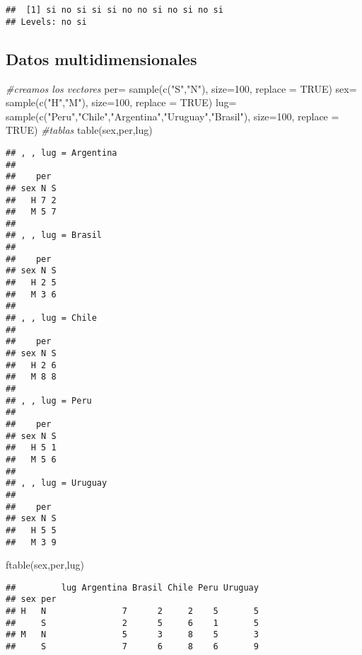 \documentclass[
]{article}
\newenvironment{Shaded}{\begin{snugshade}}{\end{snugshade}}
\newcommand{\AttributeTok}[1]{\textcolor[rgb]{0.77,0.63,0.00}{#1}}
\newcommand{\CommentTok}[1]{\textcolor[rgb]{0.56,0.35,0.01}{\textit{#1}}}
\newcommand{\ConstantTok}[1]{\textcolor[rgb]{0.00,0.00,0.00}{#1}}
\newcommand{\DecValTok}[1]{\textcolor[rgb]{0.00,0.00,0.81}{#1}}
\newcommand{\FunctionTok}[1]{\textcolor[rgb]{0.00,0.00,0.00}{#1}}
\newcommand{\NormalTok}[1]{#1}
\newcommand{\OtherTok}[1]{\textcolor[rgb]{0.56,0.35,0.01}{#1}}
\newcommand{\StringTok}[1]{\textcolor[rgb]{0.31,0.60,0.02}{#1}}
\begin{document}
\begin{verbatim}
##  [1] si no si si si no no si no si no si
## Levels: no si
\end{verbatim}

\hypertarget{datos-multidimensionales}{%
\subsection{Datos multidimensionales}\label{datos-multidimensionales}}

\begin{Shaded}
\begin{Highlighting}[]
\CommentTok{\#creamos los vectores}
\NormalTok{per}\OtherTok{=} \FunctionTok{sample}\NormalTok{(}\FunctionTok{c}\NormalTok{(}\StringTok{"S"}\NormalTok{,}\StringTok{"N"}\NormalTok{), }\AttributeTok{size=}\DecValTok{100}\NormalTok{, }\AttributeTok{replace =} \ConstantTok{TRUE}\NormalTok{)}
\NormalTok{sex}\OtherTok{=} \FunctionTok{sample}\NormalTok{(}\FunctionTok{c}\NormalTok{(}\StringTok{"H"}\NormalTok{,}\StringTok{"M"}\NormalTok{), }\AttributeTok{size=}\DecValTok{100}\NormalTok{, }\AttributeTok{replace =} \ConstantTok{TRUE}\NormalTok{)}
\NormalTok{lug}\OtherTok{=} \FunctionTok{sample}\NormalTok{(}\FunctionTok{c}\NormalTok{(}\StringTok{"Peru"}\NormalTok{,}\StringTok{"Chile"}\NormalTok{,}\StringTok{"Argentina"}\NormalTok{,}\StringTok{"Uruguay"}\NormalTok{,}\StringTok{"Brasil"}\NormalTok{), }\AttributeTok{size=}\DecValTok{100}\NormalTok{, }\AttributeTok{replace =} \ConstantTok{TRUE}\NormalTok{)}
\CommentTok{\#tablas}
\FunctionTok{table}\NormalTok{(sex,per,lug)}
\end{Highlighting}
\end{Shaded}

\begin{verbatim}
## , , lug = Argentina
## 
##    per
## sex N S
##   H 7 2
##   M 5 7
## 
## , , lug = Brasil
## 
##    per
## sex N S
##   H 2 5
##   M 3 6
## 
## , , lug = Chile
## 
##    per
## sex N S
##   H 2 6
##   M 8 8
## 
## , , lug = Peru
## 
##    per
## sex N S
##   H 5 1
##   M 5 6
## 
## , , lug = Uruguay
## 
##    per
## sex N S
##   H 5 5
##   M 3 9
\end{verbatim}

\begin{Shaded}
\begin{Highlighting}[]
\FunctionTok{ftable}\NormalTok{(sex,per,lug)}
\end{Highlighting}
\end{Shaded}

\begin{verbatim}
##         lug Argentina Brasil Chile Peru Uruguay
## sex per                                        
## H   N               7      2     2    5       5
##     S               2      5     6    1       5
## M   N               5      3     8    5       3
##     S               7      6     8    6       9
\end{verbatim}
\end{document}
